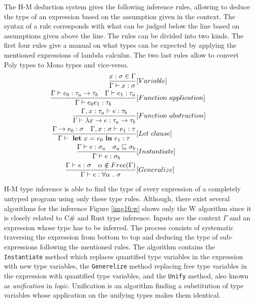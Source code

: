 \par
The H-M deduction system gives the following inference rules, allowing to deduce the type of an expression based on the assumption given in the context. 
The syntax of a rule corresponds with what can be judged below the line based on assumptions given above the line.
The rules can be divided into two kinds.
The first four rules give a manual on what types can be expected by applying the mentioned expressions of lambda calculus. 
The two last rules allow to convert Poly types to Mono types and vice-versa.
\begin{align*}
\frac{x : \sigma \in \Gamma}{\Gamma \vdash x : \sigma}&[Variable]\\
\frac{\Gamma \vdash e_0 : \tau_a \rightarrow \tau_b\ \ \ \Gamma \vdash e_1 : \tau_a}{\Gamma \vdash e_0 e_1 : \tau_b}&[Function\ application]\\
\frac{\Gamma, x : \tau_a \vdash e : \tau_b}{\Gamma \vdash \lambda x \rightarrow e : \tau_a \rightarrow \tau_b}&[Function\ abstraction]\\
\frac{\Gamma \rightarrow e_0 : \sigma \ \ \ \Gamma , x : \sigma \vdash e_1 : \tau}{\Gamma \vdash\ \text{\textbf{let}}\ x = e_0\ \text{\textbf{in}}\ e_1 : \tau}&[Let\ clause]\\
\frac{\Gamma \vdash e : \sigma_a \ \ \ \sigma_a \sqsubseteq \sigma_b}{\Gamma \vdash e : \sigma_b}&[Instantiate]\\
\frac{\Gamma \vdash e : \sigma \ \ \ \alpha \notin Free(\Gamma)}{\Gamma \vdash e : \forall \alpha\ .\ \sigma}&[Generalize]\\
\end{align*}
\par
H-M type inference is able to find the type of every expression of a completely untyped program using only these type rules.
Although, there exist several algorithms for the inference Figure \ref{img16:w} shows only the W algorithm since it is closely related to C\# and Rust type inference.
Inputs are the context $\Gamma$ and an expression whose type has to be inferred.
The process consists of systematic traversing the expression from bottom to top and deducing the type of sub-expressions following the mentioned rules.
The algorithm contains the \texttt{Instantiate} method which replaces quantified type variables in the expression with new type variables, the \texttt{Generelize} method replacing free type variables in the expression with quantified type variables, and the \texttt{Unify} method, also known as \textit{unification} in \textit{logic}.
Unification is an algorithm finding a substitution of type variables whose application on the unifying types makes them identical. 
